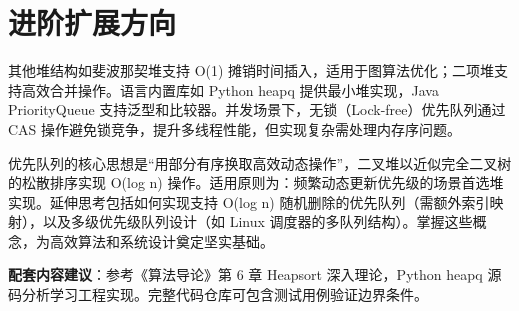 \chapter{进阶扩展方向}
其他堆结构如斐波那契堆支持 O(1) 摊销时间插入，适用于图算法优化；二项堆支持高效合并操作。语言内置库如 Python heapq 提供最小堆实现，Java PriorityQueue 支持泛型和比较器。并发场景下，无锁（Lock-free）优先队列通过 CAS 操作避免锁竞争，提升多线程性能，但实现复杂需处理内存序问题。\par
优先队列的核心思想是“用部分有序换取高效动态操作”，二叉堆以近似完全二叉树的松散排序实现 O(log n) 操作。适用原则为：频繁动态更新优先级的场景首选堆实现。延伸思考包括如何实现支持 O(log n) 随机删除的优先队列（需额外索引映射），以及多级优先级队列设计（如 Linux 调度器的多队列结构）。掌握这些概念，为高效算法和系统设计奠定坚实基础。\par
\textbf{配套内容建议}：参考《算法导论》第 6 章 Heapsort 深入理论，Python heapq 源码分析学习工程实现。完整代码仓库可包含测试用例验证边界条件。\par
